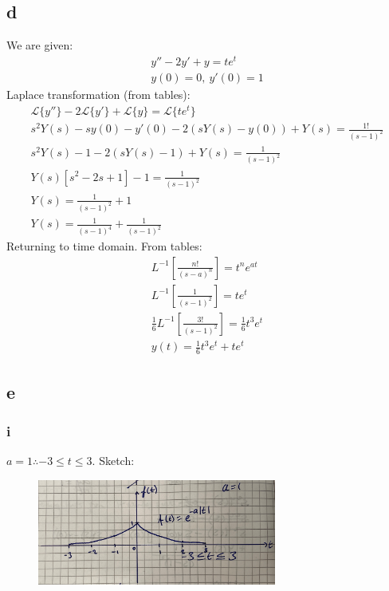\documentclass[11pt]{article}
\numberwithin{equation}{section}
\begin{document}
\subsection*{d}
We are given:
\begin{align}
	y'' - 2y' + y = te^t\\
	y(0) = 0, \ y'(0)=1
\end{align}
Laplace transformation (from tables):
\begin{gather}
	\mathcal{L} \{ y''\} - 2\mathcal{L} \{ y'\} + \mathcal{L} \{ y\} = \mathcal{L} \{te^t \}\\
	s^2 Y(s) - sy(0) - y'(0) - 2\left(sY(s) - y(0)\right) + Y(s) = \frac{1!}{\left(s-1\right)^2}\\
	s^2 Y(s) -1 -2(sY(s) - 1) + Y(s) = \frac{1}{\left(s-1\right)^2}\\
	Y(s)\left[s^2-2s+1\right] -1 = \frac{1}{\left(s-1\right)^2}\\
	Y(s) = \frac{1}{\left(s-1\right)^2} + 1\\
	Y(s) = \frac{1}{\left(s-1\right)^4} + \frac{1}{\left(s-1\right)^2}
\end{gather}
Returning to time domain. From tables:
\begin{gather}
	L^{-1}\left[\frac{n!}{\left(s-a\right)^n}\right] = t^ne^{at}\\
	L^{-1}\left[\frac{1}{\left(s-1\right)^2}\right] = te^t\\
	\frac{1}{6}L^{-1}\left[\frac{3!}{\left(s-1\right)^2}\right] = \frac{1}{6}t^3e^t\\
	y(t) = \frac{1}{6}t^3e^t + te^t
\end{gather}
\subsection*{e}
\subsubsection*{i}
$a =1 \therefore -3 \leq t \leq 3$. Sketch:
\begin{figure}[H]
	\centering
	\includegraphics[width = 0.7\textwidth]{./img/q1ei.JPG}
	\caption{}
\end{figure}
\end{document}
